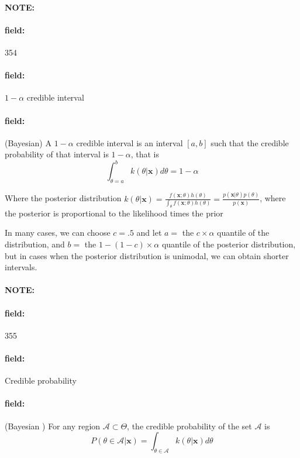 \documentclass[12pt]{article}
\newenvironment{note}{\paragraph{NOTE:}}{}
\newenvironment{field}{\paragraph{field:}}{}
\begin{document}
\begin{note}
    \begin{field}
        \tiny 354
    \end{field}
    \begin{field}
        $1 - \alpha $ credible interval
    \end{field}
    \begin{field}
        (Bayesian) A $1 - \alpha $ credible interval is an interval $[a,b]$ such that the credible probability of that interval is $1 - \alpha$, that is $$\int_{\theta=a}^b k(\theta|\mathbf{x})d\theta = 1 - \alpha $$

        Where the posterior distribution $k(\theta|\mathbf{x}) = \frac{f(\mathbf{x};\theta)h(\theta)}{\int_\theta f(\mathbf{x};\theta)h(\theta)} = \frac{p(\mathbf{x}|\theta)p(\theta)}{p(\mathbf{x})} $, where the posterior is proportional to the likelihood times the prior

        In many cases, we can choose $c=.5$ and let $a = $ the $c \times \alpha$ quantile of the distribution, and $b = $ the $1 - (1-c)\times \alpha$ quantile of the posterior distribution, but in cases when the posterior distribution is unimodal, we can obtain shorter intervals.

    \end{field}
\end{note}


\begin{note}
    \begin{field}
        \tiny 355
    \end{field}
    \begin{field}
        Credible probability
    \end{field}
    \begin{field}
        (Bayesian ) For any region $\mathscr{A} \subset \Theta$, the credible probability of the set $\mathscr{A }$ is
        $$P(\theta \in \mathscr{A }| \mathbf{x}) = \int_{\theta \in \mathscr{A }} k(\theta| \mathbf{x})d\theta $$
    \end{field}
\end{note}
\end{document}
